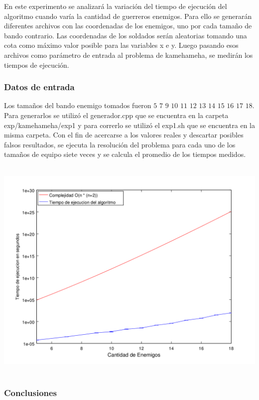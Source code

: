     		En este experimento se analizará la variación del tiempo de ejecución del algoritmo cuando varía la cantidad de guerreros enemigos. Para ello se generarán diferentes archivos con las coordenadas de los enemigos, uno por cada tamaño de bando contrario. Las coordenadas de los soldados serán aleatorias tomando una cota como máximo valor posible para las variables x e y. Luego pasando esos archivos como parámetro de entrada al problema de kamehameha, se medirán los tiempos de ejecución. \;

    	\subsubsection*{Datos de entrada}\;
    		Los tamaños del bando enemigo tomados fueron $5$ $7$ $9$ $10$ $11$ $12$ $13$ $14$ $15$ $16$ $17$ $18$.
			Para generarlos se utilizó el generador.cpp que se encuentra en la carpeta exp/kamehameha/exp1 y para correrlo se utilizó el exp1.sh que se encuentra en la misma carpeta. \;
			Con el fin de acercarse a los valores reales y descartar posibles falsos resultados, se ejecuta la resolución del problema para cada uno de los tamaños de equipo siete veces y se calcula el promedio de los tiempos medidos.\;

      \includegraphics[height=11cm]{graficos/kamehameha-exp1.png}



		\subsubsection*{Conclusiones}\;


